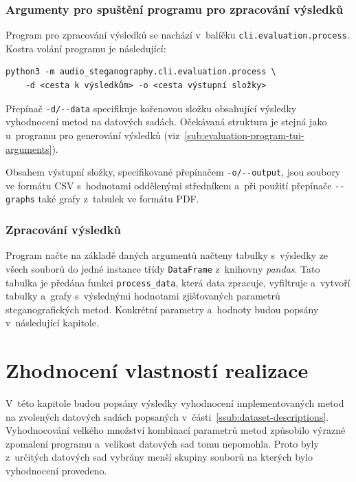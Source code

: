 \subsection*{Argumenty pro spuštění programu pro zpracování výsledků}
\label{sub:evaluation-processing-program-tui-arguments}

Program pro zpracování výsledků se nachází v~balíčku
\texttt{cli.evaluation.process}. Kostra volání programu je následující:

\begin{verbatim}
python3 -m audio_steganography.cli.evaluation.process \
    -d <cesta k výsledkům> -o <cesta výstupní složky>
\end{verbatim}

\noindent Přepínač \verb|-d/--data| specifikuje kořenovou složku obsahující
výsledky vyhodnocení metod na datových sadách. Očekávaná struktura je stejná
jako u~programu pro generování výsledků
(viz~\ref{sub:evaluation-program-tui-arguments}).

Obsahem výstupní složky, specifikované přepínačem \verb|-o/--output|, jsou
soubory ve formátu CSV s~hodnotami oddělenými středníkem a~při použití
přepínače \verb|--graphs| také grafy z~tabulek ve formátu PDF.

\subsection*{Zpracování výsledků}
\label{sub:evaluation-processing-program}

Program načte na základě daných argumentů načteny tabulky s~výsledky ze všech
souborů do jedné instance třídy \texttt{DataFrame} z~knihovny \textit{pandas}.
Tato tabulka je předána funkci \texttt{process\_data}, která data zpracuje,
vyfiltruje a~vytvoří tabulky a~grafy s~výslednými hodnotami zjišťovaných
parametrů steganografických metod. Konkrétní parametry a~hodnoty budou popsány
v~následující kapitole.


\chapter{Zhodnocení vlastností realizace}
\label{cha:method-evaluation}

V~této kapitole budou popsány výsledky vyhodnocení implementovaných metod na
zvolených datových sadách popsaných v~části~\ref{ssub:dataset-descriptions}.
Vyhodnocování velkého množství kombinací parametrů metod způsobilo výrazné
zpomalení programu a~velikost datových sad tomu nepomohla. Proto byly
z~určitých datových sad vybrány menší skupiny souborů na kterých bylo
vyhodnocení provedeno.


